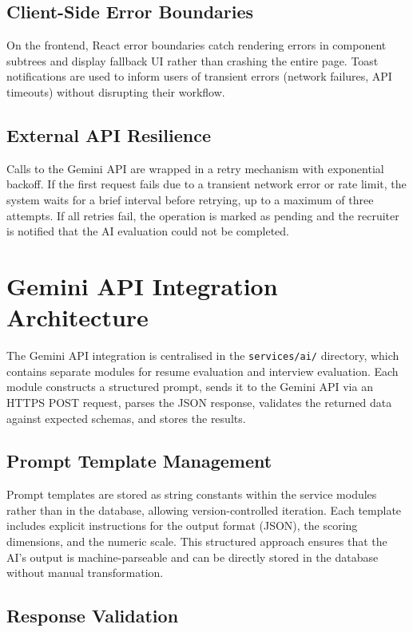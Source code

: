 \subsection{Client-Side Error Boundaries}

On the frontend, React error boundaries catch rendering errors in component subtrees and display fallback UI rather than crashing the entire page. Toast notifications are used to inform users of transient errors (network failures, API timeouts) without disrupting their workflow.

\subsection{External API Resilience}

Calls to the Gemini API are wrapped in a retry mechanism with exponential backoff. If the first request fails due to a transient network error or rate limit, the system waits for a brief interval before retrying, up to a maximum of three attempts. If all retries fail, the operation is marked as pending and the recruiter is notified that the AI evaluation could not be completed.

\section{Gemini API Integration Architecture}
\label{sec:impl-gemini}

The Gemini API integration is centralised in the \texttt{services/ai/} directory, which contains separate modules for resume evaluation and interview evaluation. Each module constructs a structured prompt, sends it to the Gemini API via an HTTPS POST request, parses the JSON response, validates the returned data against expected schemas, and stores the results.

\subsection{Prompt Template Management}

Prompt templates are stored as string constants within the service modules rather than in the database, allowing version-controlled iteration. Each template includes explicit instructions for the output format (JSON), the scoring dimensions, and the numeric scale. This structured approach ensures that the AI's output is machine-parseable and can be directly stored in the database without manual transformation.

\subsection{Response Validation}

